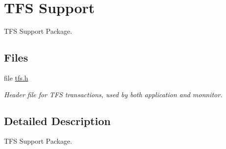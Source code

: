 \hypertarget{group__shared__tfs}{}\section{T\+FS Support}
\label{group__shared__tfs}


T\+FS Support Package.  


\subsection*{Files}
\begin{DoxyCompactItemize}
\item 
file \mbox{\hyperlink{tfs_8h}{tfs.\+h}}
\begin{DoxyCompactList}\small\item\em Header file for T\+FS transactions, used by both application and monnitor. \end{DoxyCompactList}\end{DoxyCompactItemize}


\subsection{Detailed Description}
T\+FS Support Package. 

